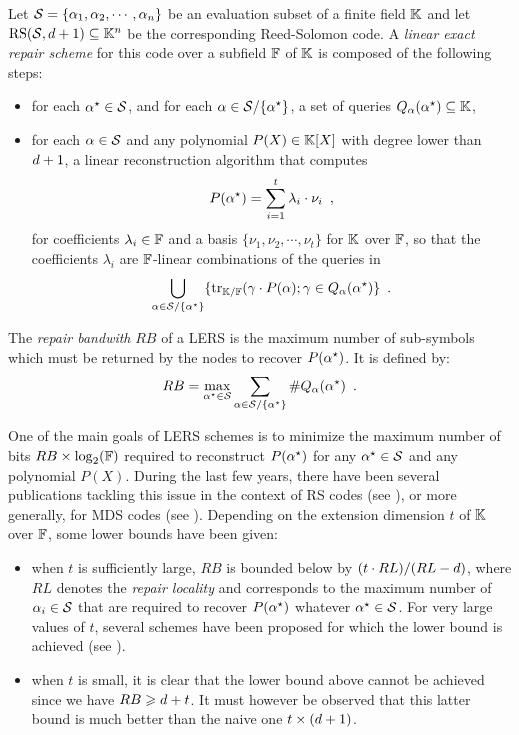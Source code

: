 \documentclass{llncs}
\begin{document}
\begin{definition}\label{def:LERS}
Let $\pubSet = \{\pubElt[1],\pubElt[2],\cdots,\pubElt[\nbShares]\}$ be an evaluation subset of a finite field $\Field$ and let $\RS[\pubSet, \order + 1]\subseteq \Field^{\nbShares}$ be the corresponding Reed-Solomon code. A {\em linear exact repair scheme} for this code over a subfield $\FField$ of $\Field$ is composed of the following steps:
\begin{itemize}
\item for each $\pubEltStar\in \pubSet$, and for each $\pubEltNoIndex\in \pubSet \slash \{\pubEltStar\}$, a set of queries $Q_{\pubEltNoIndex}(\pubEltStar)\subseteq \Field$,
\item for each $\pubEltNoIndex \in \pubSet$ and any polynomial $P(X)\in \Field[X]$ with degree lower than $\order +1$, a linear reconstruction algorithm that computes 
$$
P(\pubEltStar) = \sum_{i=1}^t\lambda_i \cdot \nu_i \enspace ,
$$
for coefficients $\lambda_i\in \FField$ and a basis $\{\nu_1,\nu_2,\cdots,\nu_t\}$ for $\Field$ over $\FField$, so that the coefficients $\lambda_i$ are $\FField$-linear combinations of the queries in 
$$
\bigcup_{\pubEltNoIndex \in \pubSet \slash \{\pubEltStar\}}\{\myTrace(\gamma\cdot P(\pubEltNoIndex); \gamma \in Q_{\pubEltNoIndex}(\pubEltStar)\} \enspace .
$$
\end{itemize}
\end{definition}

The {\em repair bandwith} $RB$ of a LERS is the maximum number of sub-symbols which must be returned by the nodes to recover $P(\pubEltStar)$. It is defined by:
$$
RB = \max_{\pubEltStar \in \pubSet} \sum_{\pubEltNoIndex \in \pubSet \slash \{\pubEltStar\}} \# Q_{\pubEltNoIndex}(\pubEltStar) \enspace .
$$

One of the main goals of LERS schemes is to minimize the maximum number of bits $RB\times \log_2(\FField)$ required to reconstruct $P(\pubEltStar)$ for any $\pubEltStar\in \pubSet$ and any polynomial $P(X)$. During the last few years, there have been several publications tackling this issue in the context of RS codes (see \eg \cite{DRWS11,SPDC13}), or more generally, for MDS codes (see \eg \cite{CHJL11,DGWWR10,SR10}). Depending on the extension dimension $t$ of $\Field$ over $\FField$, some lower bounds have been given:
\begin{itemize}
\item when $t$ is sufficiently large, $RB$ is bounded below by $(t\cdot RL)/(RL-\order)$, where $RL$ denotes the {\em repair locality} and corresponds to the maximum number of $\pubElt \in \pubSet$ that are required to recover $P(\pubEltStar)$ whatever $\pubEltStar \in \pubSet$. For very large values of $t$, several schemes have been proposed for which the lower bound is achieved (see \eg \cite{CHJL11,SR10}).
\item when $t$ is small, it is clear that the lower bound above cannot be achieved since we have $RB \geqslant \order + t$. It must however be observed that this latter bound is much better than the naive one $t\times (\order + 1)$. 
\end{itemize}
\end{document}
